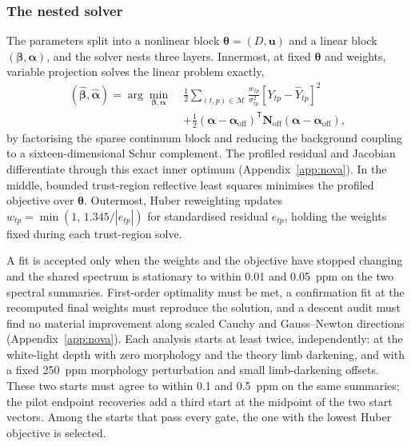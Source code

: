 \subsubsection{The nested solver}


The parameters split into a nonlinear block $\bm{\theta}=(D,\bm{u})$ and
a linear block $(\bm{\beta},\bm{\alpha})$, and the solver nests three
layers. Innermost, at fixed $\bm{\theta}$ and weights, variable
projection \citep{GolubPereyra1973} solves the linear problem exactly,
\begin{equation}
\begin{split}
 (\widehat{\bm{\beta}},\widehat{\bm{\alpha}})=
 \arg\min_{\bm{\beta},\bm{\alpha}}\;
 &\frac{1}{2}\sum_{(t,p)\in\mathcal{M}}\frac{w_{tp}}{\sigma_{tp}^2}
 \left[Y_{tp}-\widehat Y_{tp}\right]^2 \\
 &+\frac{1}{2}(\bm{\alpha}-\bm{\alpha}_{\mathrm{off}})^{\mathsf T}
   \bm{N}_{\mathrm{off}}(\bm{\alpha}-\bm{\alpha}_{\mathrm{off}}),
\end{split}
 \label{eq:varpro}
\end{equation}
by factorising the sparse continuum block and reducing the background
coupling to a sixteen-dimensional Schur complement. The profiled
residual and Jacobian differentiate through this exact inner optimum
(Appendix~\ref{app:nova}). In the middle, bounded trust-region reflective
least squares \citep{BranchColemanLi1999} minimises the profiled
objective over $\bm{\theta}$. Outermost, Huber reweighting
\citep{Huber1964} updates $w_{tp}=\min(1,\,1.345/|e_{tp}|)$ for
standardised residual $e_{tp}$, holding the weights fixed during each
trust-region solve.

A fit is accepted only when the weights and the objective have stopped
changing and the shared spectrum is stationary to within 0.01 and
0.05~ppm on the two spectral summaries. First-order optimality must be
met, a confirmation fit at the recomputed final weights must reproduce
the solution, and a descent audit must find no material improvement
along scaled Cauchy and Gauss--Newton directions
(Appendix~\ref{app:nova}). Each analysis starts at least twice,
independently: at the white-light depth with zero morphology and the
theory limb darkening, and with a fixed 250~ppm morphology perturbation
and small limb-darkening offsets. These two starts must agree to within
0.1 and 0.5~ppm on the same summaries; the pilot endpoint recoveries
add a third start at the midpoint of the two start vectors. Among the starts that
pass every gate, the one with the lowest Huber objective is selected.

